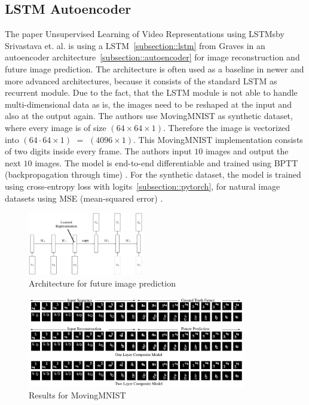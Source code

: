  \subsection{LSTM Autoencoder} \label{subsection::lstm_autoencoder}
  The paper \glqq Unsupervised Learning of Video Representations using LSTMs\grqq by Srivastava et. al. \cite{Srivastava2015} is using a LSTM~\ref{subsection::lstm} from Graves 
  \cite{Graves2013} in an autoencoder architecture~\ref{subsection::autoencoder} for image reconstruction and future image prediction.
  The architecture is often used as a baseline in newer and more advanced architectures, because it consists of the standard LSTM as recurrent module.
  Due to the fact, that the LSTM module is not able to handle multi-dimensional data as is, the images need to be reshaped at the input and also at the output again. The authors use
  MovingMNIST \cite{LeCun1998} as synthetic dataset, where every image is of size $(64 \times 64 \times 1)$. Therefore the image is vectorized into $(64 \cdot 64 \times 1)$ $=$ $(4096 \times 1)$.
  This MovingMNIST implementation consists of two digits inside every frame. The authors input $10$ images and output the next $10$ images.
  The model is end-to-end differentiable and trained using BPTT (backpropagation through time) \cite{Werbos1990}.
  For the synthetic dataset, the model is trained using cross-entropy loss with logits~\ref{subsection::pytorch}, for natural image
  datasets using MSE (mean-squared error) \cite{Zhao2017}.
  \begin{figure}[H]
   \includegraphics[width=0.45\textwidth]{../Images/srivastava.png}
   \centering
   \caption{Architecture for future image prediction \cite{Srivastava2015}}
   \label{fig:lstm_architecture}
  \end{figure}
  \begin{figure}[H]
   \includegraphics[width=0.85\textwidth]{../Images/srivastava_results_mnist.png}
   \centering
   \caption{Results for MovingMNIST \cite{Srivastava2015}}
   \label{fig:lstm_results}
  \end{figure}

